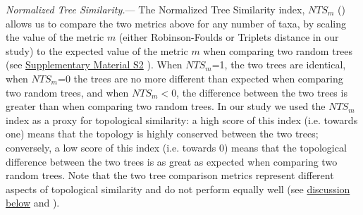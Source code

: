 \documentclass[12pt,letterpaper]{article}
\renewcommand{\subsubsection}[1]{%
\vspace{2ex}
\noindent
\textit{#1.}---}
\begin{document}
\subsubsection{Normalized Tree Similarity}
The Normalized Tree Similarity index, $NTS_m$ (\citealp{Bogdanowicz2012}) allows us to compare the two metrics above for any number of taxa, by scaling the value of the metric $m$ (either Robinson-Foulds or Triplets distance in our study) to the expected value of the metric $m$ when comparing two random trees (see \hyperref[SupplementaryMaterial]{Supplementary Material S2}
). When $NTS_m$=1, the two trees are identical, when $NTS_m$=0 the trees are no more different than expected when comparing two random trees, and when $NTS_m$$<$0, the difference between the two trees is greater than when comparing two random trees. In our study we used the $NTS_m$ index as a proxy for topological similarity: a high score of this index (i.e. towards one) means that the topology is highly conserved between the two trees; conversely, a low score of this index (i.e. towards 0) means that the topological difference between the two trees is as great as expected when comparing two random trees. Note that the two tree comparison metrics represent different aspects of topological similarity and do not perform equally well (see \hyperref[metrics_discussion]{discussion below} and \citealt{kuhnerpractical2014}).

\end{document}
